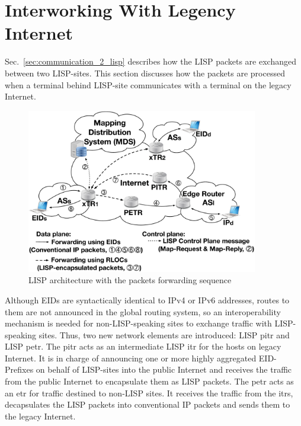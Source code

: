 \section{Interworking With Legency Internet}
\label{sec:background_Interworking}

Sec.~\ref{sec:communication_2_lisp} describes how the LISP packets are exchanged between two LISP-sites. This section discusses how the packets are processed when a terminal behind LISP-site communicates with a terminal on the legacy Internet.

\begin{figure}[!t]
	\centering
	\includegraphics[width=0.9\textwidth]{Pics/LISP_archi_PxTR.eps}
	\caption{LISP architecture with the packets forwarding sequence}
	\label{LISP_archi_PxTR}
\end{figure}
Although EIDs are syntactically identical to IPv4 or IPv6 addresses, routes to them are not announced in the global routing system, so an interoperability mechanism is needed for non-LISP-speaking sites to exchange traffic with LISP-speaking sites. Thus, two new network elements are introduced: LISP \acrfull{pitr} and LISP \acrfull{petr}. The \acrshort{pitr} acts as an intermediate LISP \acrshort{itr} for the hosts on legacy Internet. It is in charge of announcing one or more highly aggregated EID-Prefixes on behalf of LISP-sites into the public Internet and receives the traffic from the public Internet to encapsulate them as LISP packets. The \acrshort{petr} acts as an \acrshort{etr} for traffic destined to non-LISP sites. It receives the traffic from the \acrshort{itr}s, decapsulates the LISP packets into conventional IP packets and sends them to the legacy Internet.

